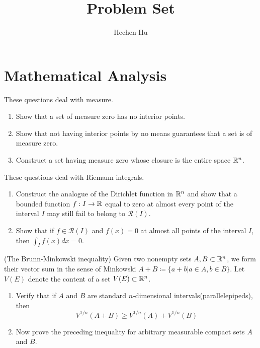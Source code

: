 \documentclass{article}
\newenvironment{problem}[2][Problem]{\begin{trivlist}
\item[\hskip \labelsep {\bfseries #1}\hskip \labelsep {\bfseries #2.}]}{\end{trivlist}}
\begin{document}
	
	\title{Problem Set}
	\author{Hechen Hu}
	\maketitle
	
\section{Mathematical Analysis}
\begin{problem}{1}
	These questions deal with measure.
	\begin{enumerate}
		\item Show that a set of measure zero has no interior points.
		\item Show that not having interior points by no means guarantees that a set is of measure zero.
		\item Construct a set having measure zero whose closure is the entire space $ \mathbb{R}^n $.
	\end{enumerate}
\end{problem}
\begin{problem}{2}
	These questions deal with Riemann integrals.
	\begin{enumerate}
		\item Construct the analogue of the Dirichlet function in $ \mathbb{R}^n $ and show that a bounded function $ f:I \to \mathbb{R} $ equal to zero at almost every point of the interval $ I $ may still fail to belong to $ \mathcal{R}(I) $. 
		\item Show that if $ f \in \mathcal{R}(I) $ and $ f(x)=0 $ at almost all points of the interval $ I $, then $ \int_{I}f(x)dx = 0 $.
	\end{enumerate}
\end{problem}
\begin{problem}{3}(The Brunn-Minkowski inequality)
	Given two nonempty sets $ A,B \subset \mathbb{R}^n $, we form their vector sum in the sense of Minkowski $ A+B \coloneqq \{a+b|a \in A,b \in B \} $. Let $ V(E) $ denote the content of a set $ V(E)\subset \mathbb{R}^n $.
	\begin{enumerate}
		\item Verify that if $ A $ and $ B $ are standard $ n $-dimensional intervals(parallelepipeds), then
		\begin{equation}
			V^{1/n}(A+B)\geqslant V^{1/n}(A)+V^{1/n}(B) \nonumber
		\end{equation}
		\item Now prove the preceding inequality for arbitrary measurable compact sets $ A $ and $ B $.
	\end{enumerate}
\end{problem}
\end{document}
